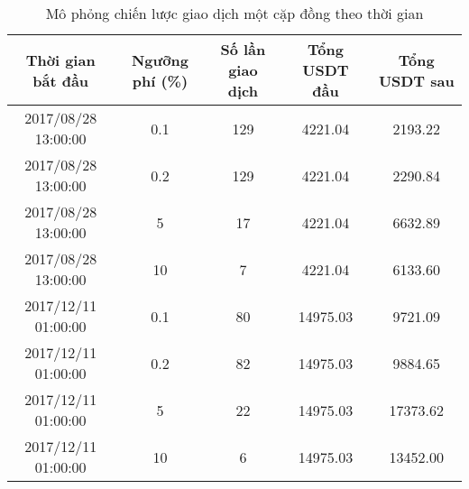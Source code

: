 
\begin{table}[ht]

\centering %
\begin{tabular}{c c c c c} %
\hline\hline %
\multirow{2}{*}{Thời gian bắt đầu}  & \multirow{2}{*}{Ngưỡng phí (\%)} &
\multirow{2}{*}{Số lần giao dịch} & 
\multirow{2}{*}{Tổng USDT đầu} & 
\multirow{2}{*}{Tổng USDT sau} \\[2.5ex] %
\hline %
\rowcolor{maroon!10}
2017/08/28 13:00:00 & 0.1 & 129 & 4221.04 & 2193.22 \\
\rowcolor{maroon!10}
2017/08/28 13:00:00 & 0.2 & 129 & 4221.04 & 2290.84 \\
\rowcolor{LightCyan}
2017/08/28 13:00:00 & 5 & 17 & 4221.04 & 6632.89 \\
\rowcolor{LightCyan}
2017/08/28 13:00:00 & 10 & 7 & 4221.04 & 6133.60 \\
\rowcolor{maroon!10}
2017/12/11 01:00:00 & 0.1 & 80 & 14975.03 & 9721.09 \\
\rowcolor{maroon!10}
2017/12/11 01:00:00 & 0.2 & 82 & 14975.03 & 9884.65 \\
\rowcolor{LightCyan}
2017/12/11 01:00:00 & 5 & 22 & 14975.03 & 17373.62 \\
\rowcolor{maroon!10}
2017/12/11 01:00:00 & 10 & 6 & 14975.03 & 13452.00 \\[1ex] %



\hline %
\end{tabular}
\label{table:nonlin} %

\caption{Mô phỏng chiến lược giao dịch một cặp đồng theo thời gian}
\end{table}

